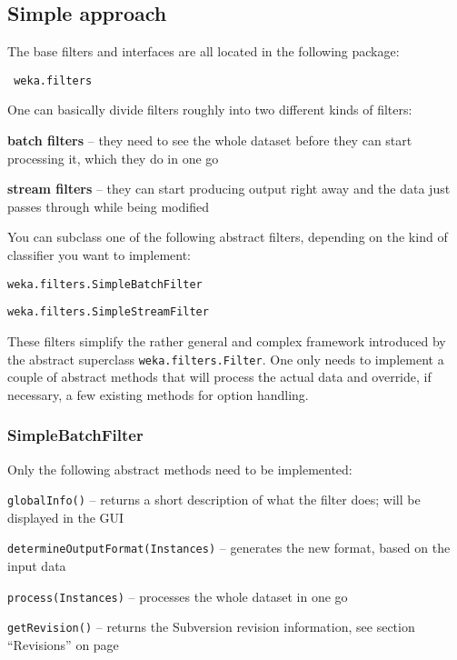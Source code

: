 \subsection{Simple approach}
The base filters and interfaces are all located in the following package:
\begin{verbatim}
 weka.filters
\end{verbatim}
One can basically divide filters roughly into two different kinds of
filters:
\begin{tight_itemize}
  \item \textbf{batch filters} -- they need to see the whole dataset before they
can start processing it, which they do in one go
  \item \textbf{stream filters} -- they can start producing output right away
and the data just passes through while being modified
\end{tight_itemize}
You can subclass one of the following abstract filters, depending on the kind of
classifier you want to implement:
\begin{tight_itemize}
  \item \texttt{weka.filters.SimpleBatchFilter}
  \item \texttt{weka.filters.SimpleStreamFilter}
\end{tight_itemize}
These filters simplify the rather general and complex framework introduced by
the abstract superclass \texttt{weka.filters.Filter}. One only needs to
implement a couple of abstract methods that will process the actual data and
override, if necessary, a few existing methods for option handling.

\subsubsection{SimpleBatchFilter}
Only the following abstract methods need to be implemented:
\begin{tight_itemize}
  \item \texttt{globalInfo()} -- returns a short description of what the
filter does; will be displayed in the GUI
  \item \texttt{determineOutputFormat(Instances)} -- generates the new
format, based on the input data
  \item \texttt{process(Instances)} -- processes the whole dataset in one
go
  \item \texttt{getRevision()} -- returns the Subversion revision information,
see section ``Revisions'' on page \pageref{filter_revisions}
\end{tight_itemize}

